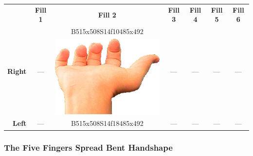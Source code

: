 \documentclass{article}
\begin{document}
\begin{center}
\begin{tabular}{r*{6}{c}}
&\textbf{Fill 1}&\textbf{Fill 2}&\textbf{Fill 3}&\textbf{Fill 4}&\textbf{Fill 5}&\textbf{Fill 6}\\
\multirow{2}{*}{\textbf{Right}}&
\multirow{2}{*}{---}&
B515x508S14f10485x492&
\multirow{2}{*}{---}&
\multirow{2}{*}{---}&
\multirow{2}{*}{---}&
\multirow{2}{*}{---}\\
&
&
\includegraphics[scale=0.1]{images/05-04-2.jpg}\\
\textbf{Left}&
---&
B515x508S14f18485x492&
---&
---&
---&
---\\
\end{tabular}
\end{center}

\subsubsection{The Five Fingers Spread Bent Handshape}
\end{document}
